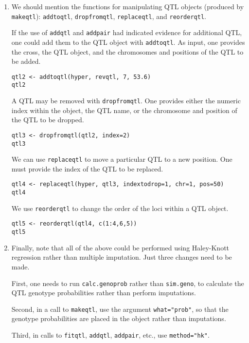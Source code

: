 \documentclass[10pt,letterpaper]{article}
\newcommand{\usercolor}{\color [named]{BlueViolet}}
\begin{document}
\begin{enumerate}
\item We should mention the functions for manipulating
  QTL objects (produced by \verb-makeqtl-): \verb-addtoqtl-,
  \verb-dropfromqtl-, \verb-replaceqtl-, and \verb-reorderqtl-.  

  If the use of \verb-addqtl- and \verb-addpair- had indicated
  evidence for additional QTL, one could add them to the QTL object
  with \verb-addtoqtl-.  As input, one provides the cross, the QTL
  object, and the chromosomes and positions of the QTL to be added.

\usercolor
\verb|qtl2 <- addtoqtl(hyper, revqtl, 7, 53.6)| \\
\verb|qtl2|
\normalcolor

  A QTL may be removed with \verb-dropfromqtl-.  One provides either
  the numeric index within the object, the QTL name, or the chromosome and
  position of the QTL to be dropped.

\usercolor
\verb|qtl3 <- dropfromqtl(qtl2, index=2)| \\
\verb|qtl3|
\normalcolor

  We can use \verb-replaceqtl- to move a particular QTL to a new
  position.  One must provide the index of the QTL to be replaced.

\usercolor
\verb|qtl4 <- replaceqtl(hyper, qtl3, indextodrop=1, chr=1, pos=50)|
\\
\verb|qtl4|
\normalcolor

  We use \verb-reorderqtl- to change the order of the loci within a
  QTL object.

\usercolor
\verb|qtl5 <- reorderqtl(qtl4, c(1:4,6,5))| \\
\verb|qtl5|
\normalcolor

\item Finally, note that all of the above could be performed using
  Haley-Knott regression rather than multiple imputation.  Just three
  changes need to be made.  

  First, one needs to run
  \verb-calc.genoprob- rather than \verb-sim.geno-, to calculate the
  QTL genotype probabilities rather than perform imputations.

  Second, in a call to \verb-makeqtl-, use the argument
  \verb-what="prob"-, so that the genotype probabilities are placed in
  the object rather than imputations.

  Third, in calls to \verb-fitqtl-, \verb-addqtl-, \verb-addpair-,
  etc., use \verb-method="hk"-.

\end{enumerate}
\end{document}
